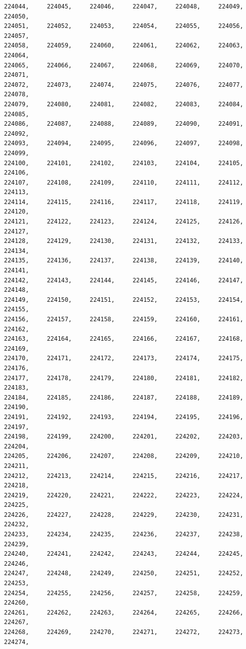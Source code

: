 \documentclass[a4paper,11pt]{report}
\begin{document}
\begin{verbatim}
224044,     224045,     224046,     224047,     224048,     224049,     224050,
224051,     224052,     224053,     224054,     224055,     224056,     224057,
224058,     224059,     224060,     224061,     224062,     224063,     224064,
224065,     224066,     224067,     224068,     224069,     224070,     224071,
224072,     224073,     224074,     224075,     224076,     224077,     224078,
224079,     224080,     224081,     224082,     224083,     224084,     224085,
224086,     224087,     224088,     224089,     224090,     224091,     224092,
224093,     224094,     224095,     224096,     224097,     224098,     224099,
224100,     224101,     224102,     224103,     224104,     224105,     224106,
224107,     224108,     224109,     224110,     224111,     224112,     224113,
224114,     224115,     224116,     224117,     224118,     224119,     224120,
224121,     224122,     224123,     224124,     224125,     224126,     224127,
224128,     224129,     224130,     224131,     224132,     224133,     224134,
224135,     224136,     224137,     224138,     224139,     224140,     224141,
224142,     224143,     224144,     224145,     224146,     224147,     224148,
224149,     224150,     224151,     224152,     224153,     224154,     224155,
224156,     224157,     224158,     224159,     224160,     224161,     224162,
224163,     224164,     224165,     224166,     224167,     224168,     224169,
224170,     224171,     224172,     224173,     224174,     224175,     224176,
224177,     224178,     224179,     224180,     224181,     224182,     224183,
224184,     224185,     224186,     224187,     224188,     224189,     224190,
224191,     224192,     224193,     224194,     224195,     224196,     224197,
224198,     224199,     224200,     224201,     224202,     224203,     224204,
224205,     224206,     224207,     224208,     224209,     224210,     224211,
224212,     224213,     224214,     224215,     224216,     224217,     224218,
224219,     224220,     224221,     224222,     224223,     224224,     224225,
224226,     224227,     224228,     224229,     224230,     224231,     224232,
224233,     224234,     224235,     224236,     224237,     224238,     224239,
224240,     224241,     224242,     224243,     224244,     224245,     224246,
224247,     224248,     224249,     224250,     224251,     224252,     224253,
224254,     224255,     224256,     224257,     224258,     224259,     224260,
224261,     224262,     224263,     224264,     224265,     224266,     224267,
224268,     224269,     224270,     224271,     224272,     224273,     224274,

\end{verbatim}
\end{document}
